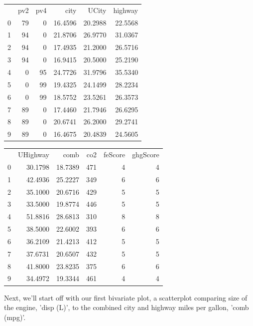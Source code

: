 \begin{tabular}{lrrrrr}
	{} &  pv2 &  pv4 &     city &    UCity &  highway \\
	0 &   79 &    0 &  16.4596 &  20.2988 &  22.5568 \\
	1 &   94 &    0 &  21.8706 &  26.9770 &  31.0367 \\
	2 &   94 &    0 &  17.4935 &  21.2000 &  26.5716 \\
	3 &   94 &    0 &  16.9415 &  20.5000 &  25.2190 \\
	4 &    0 &   95 &  24.7726 &  31.9796 &  35.5340 \\
	5 &    0 &   99 &  19.4325 &  24.1499 &  28.2234 \\
	6 &    0 &   99 &  18.5752 &  23.5261 &  26.3573 \\
	7 &   89 &    0 &  17.4460 &  21.7946 &  26.6295 \\
	8 &   89 &    0 &  20.6741 &  26.2000 &  29.2741 \\
	9 &   89 &    0 &  16.4675 &  20.4839 &  24.5605 \\
\end{tabular}

\begin{tabular}{lrrrrr}
	{} &  UHighway &     comb &  co2 &  feScore &  ghgScore \\
	0 &   30.1798 &  18.7389 &  471 &        4 &         4 \\
	1 &   42.4936 &  25.2227 &  349 &        6 &         6 \\
	2 &   35.1000 &  20.6716 &  429 &        5 &         5 \\
	3 &   33.5000 &  19.8774 &  446 &        5 &         5 \\
	4 &   51.8816 &  28.6813 &  310 &        8 &         8 \\
	5 &   38.5000 &  22.6002 &  393 &        6 &         6 \\
	6 &   36.2109 &  21.4213 &  412 &        5 &         5 \\
	7 &   37.6731 &  20.6507 &  432 &        5 &         5 \\
	8 &   41.8000 &  23.8235 &  375 &        6 &         6 \\
	9 &   34.4972 &  19.3344 &  461 &        4 &         4 \\
\end{tabular}
\newpage

Next, we'll start off with our first bivariate plot, a scatterplot comparing size of the engine, 'disp (L)', to the combined city and highway miles per gallon, 'comb (mpg)'.

